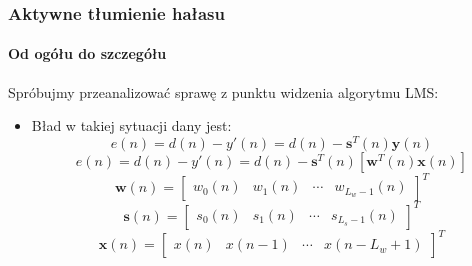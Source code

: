 \documentclass{beamer}
\begin{document}
        \begin{frame}
            \frametitle{Aktywne tłumienie hałasu}
            \framesubtitle{Od ogółu do szczegółu}
            Spróbujmy przeanalizować sprawę z punktu widzenia algorytmu LMS:
                \begin{itemize}
                    \item Bład w takiej sytuacji dany jest:
                    \begin{equation}
                        e(n) = d(n) - y'(n) = d(n) - \textbf{s}^T(n)\textbf{y}(n)
                    \end{equation}
                    \begin{equation}
                        e(n) = d(n) - y'(n) = d(n) - \textbf{s}^T(n)[\textbf{w}^T(n)\textbf{x}(n)]
                    \end{equation}
                    \begin{equation}
                        \textbf{w}(n) = \begin{bmatrix} w_0(n) & w_1(n) & \cdots & w_{L_w-1}(n) \end{bmatrix}^T
                    \end{equation}
                    \begin{equation}
                        \textbf{s}(n) = \begin{bmatrix} s_0(n) & s_1(n) & \cdots & s_{L_s-1}(n) \end{bmatrix}^T
                    \end{equation}
                    \begin{equation}
                        \textbf{x}(n) = \begin{bmatrix} x(n) & x(n - 1) & \cdots & x(n - L_w + 1) \end{bmatrix}^T
                    \end{equation}
            \end{itemize}
        \end{frame}
\end{document}
